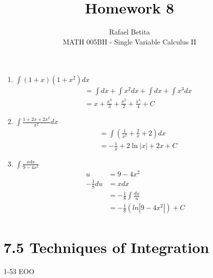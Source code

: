 \documentclass[12pt]{article}
\begin{document}
 
 
\title{Homework 8}
\author{Rafael Betita\\ 
MATH 005BH - Single Variable Calculus II}
 
\maketitle
 
\newpage

\begin{enumerate}
    \item $\int (1+x)(1+x^2)dx$
        \begin{align*}
             &=\int dx + \int x^2dx + \int dx + \int x^3dx \\
             &= x +\frac{x^3}{3} + \frac{x^2}{2} + \frac{x^4}{4} + C 
        \end{align*}
        
    \item $\int \frac{1+2x+2x^2}{x^2}dx$
        \begin{align*}
            &= \int \left(\frac{1}{x^2}+\frac{2}{x}+2\right)dx\\
            &= -\frac{1}{x}+2\ln|x|+2x+C
        \end{align*}

    \item $\int \frac{xdx}{9-4x^2}$
        \begin{align*}
            u &= 9-4x^2\\
            -\frac{1}{8}du &= xdx\\
            &= -\frac{1}{8}\int\frac{du}{u}\\
            &= -\frac{1}{8}\left(ln|9-4x^2|\right)+C\\
        \end{align*}
    
\end{enumerate}

\newpage
\section{7.5 Techniques of Integration} 1-53 EOO
\end{document}
